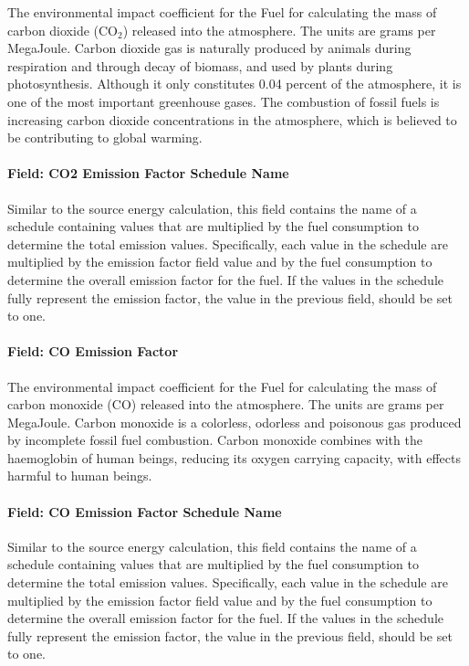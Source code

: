 The environmental impact coefficient for the Fuel for calculating the mass of carbon dioxide (CO\(_{2}\)) released into the atmosphere. The units are grams per MegaJoule. Carbon dioxide gas is naturally produced by animals during respiration and through decay of biomass, and used by plants during photosynthesis. Although it only constitutes 0.04 percent of the atmosphere, it is one of the most important greenhouse gases. The combustion of fossil fuels is increasing carbon dioxide concentrations in the atmosphere, which is believed to be contributing to global warming.

\paragraph{Field: CO2 Emission Factor Schedule Name}\label{field-co2-emission-factor-schedule-name}

Similar to the source energy calculation, this field contains the name of a schedule containing values that are multiplied by the fuel consumption to determine the total emission values. Specifically, each value in the schedule are multiplied by the emission factor field value and by the fuel consumption to determine the overall emission factor for the fuel. If the values in the schedule fully represent the emission factor, the value in the previous field, should be set to one.

\paragraph{Field: CO Emission Factor}\label{field-co-emission-factor}

The environmental impact coefficient for the Fuel for calculating the mass of carbon monoxide (CO) released into the atmosphere. The units are grams per MegaJoule. Carbon monoxide is a colorless, odorless and poisonous gas produced by incomplete fossil fuel combustion. Carbon monoxide combines with the haemoglobin of human beings, reducing its oxygen carrying capacity, with effects harmful to human beings.

\paragraph{Field: CO Emission Factor Schedule Name}\label{field-co-emission-factor-schedule-name}

Similar to the source energy calculation, this field contains the name of a schedule containing values that are multiplied by the fuel consumption to determine the total emission values. Specifically, each value in the schedule are multiplied by the emission factor field value and by the fuel consumption to determine the overall emission factor for the fuel. If the values in the schedule fully represent the emission factor, the value in the previous field, should be set to one.

